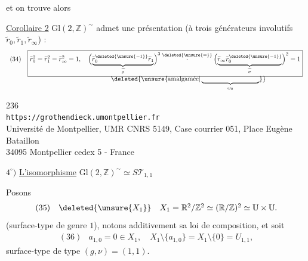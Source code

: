 
et on trouve alors

\uline{Corollaire 2} $\mathrm{Gl}(2,\mathbb Z)^{\sim}$ admet une présentation (à trois générateurs involutifs $\widetilde r_0,\widetilde r_1,\widetilde r_\infty$) :
\[
\begin{array}{ll}
(34)&\boxed{\widetilde r_0^2=\widetilde r_1^2=\widetilde r_\infty^2=1,\quad
\Bigl(\underbrace{\widetilde r_0^{\deleted{\unsure{-1}}}\widetilde r_1}_{\widetilde\rho}\Bigr)^3
\overset{\deleted{\unsure{=}}}{\cdot}
\Bigl(\underbrace{\widetilde r_\infty\widetilde r_0^{\deleted{\unsure{-1}}}}_{\widetilde\sigma}\Bigr)^2=1}\\[-2pt]
&\hspace{13em}\deleted{\unsure{\text{amalgamée}|\underbrace{\hspace{9em}}_{\omega_0}}}
\end{array}
\]


\begin{center}
236\\
\texttt{https://grothendieck.umontpellier.fr}\\
Université de Montpellier, UMR CNRS 5149, Case courrier 051, Place Eugène Bataillon\\
34095 Montpellier cedex 5 - France
\end{center}


$4^\circ)$ \uline{L'isomorphisme} $\mathrm{Gl}(2,\mathbb Z)^{\sim}\simeq S\mathcal T_{1,1}$

\margin{$\unsure{\checkmark}$}
Posons
\[
\begin{array}{ll}
(35)&\deleted{\unsure{X_1}}\quad X_1=\mathbb R^2/\mathbb Z^2\simeq(\mathbb R/\mathbb Z)^2\simeq\mathbb U\times\mathbb U.
\end{array}
\]
(surface-type de genre $1$), notons additivement sa loi de composition, et soit
\[
\begin{array}{ll}
(36)&a_{1,0}=0\in X_1,\quad X_1\setminus\{a_{1,0}\}=X_1\setminus\{0\}=U_{1,1},
\end{array}
\]
surface-type de type $(g,\nu)=(1,1)$.

